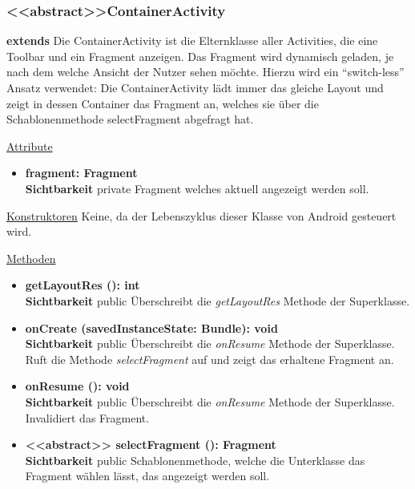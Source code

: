 \subsubsection{<<abstract>>ContainerActivity} \label{app:klasse:ContainerActivity}
\textbf{extends}  \newline
Die ContainerActivity ist die Elternklasse aller Activities, die eine Toolbar und ein Fragment anzeigen. Das Fragment wird dynamisch geladen, je nach dem welche Ansicht der Nutzer sehen möchte. Hierzu wird ein ``switch-less'' Ansatz verwendet: Die ContainerActivity lädt immer das gleiche Layout und zeigt in dessen Container das Fragment an, welches sie über die Schablonenmethode selectFragment abgefragt hat.
\newline

\underline{Attribute}
\begin{itemize}
\itemsep0pt
\item \textbf{fragment: Fragment} \hfill\\ 
\textbf{Sichtbarkeit} private\newline
Fragment welches aktuell angezeigt werden soll.

\end{itemize}

\underline{Konstruktoren}\newline
\indent Keine, da der Lebenszyklus dieser Klasse von Android gesteuert wird.\newline

\underline{Methoden}
\begin{itemize}
\itemsep0pt

\item \textbf{getLayoutRes (): int}\hfill\\
\textbf{Sichtbarkeit} public\newline
Überschreibt die \textit{getLayoutRes} Methode der Superklasse.

\item \textbf{onCreate (savedInstanceState: Bundle): void}\hfill\\
\textbf{Sichtbarkeit} public\newline
Überschreibt die \textit{onResume} Methode der Superklasse. Ruft die Methode \textit{selectFragment} auf und zeigt das erhaltene Fragment an.

\item \textbf{onResume (): void}\hfill\\
\textbf{Sichtbarkeit} public\newline
Überschreibt die \textit{onResume} Methode der Superklasse. Invalidiert das Fragment.

\item \textbf{<<abstract>> selectFragment (): Fragment} \hfill\\
\textbf{Sichtbarkeit} public\newline
Schablonenmethode, welche die Unterklasse das Fragment wählen lässt, das angezeigt werden soll.

\end{itemize}